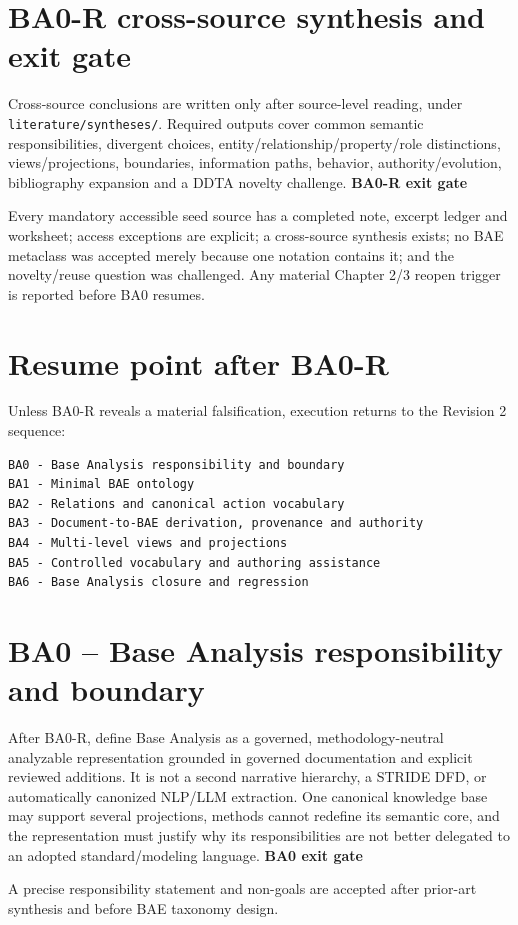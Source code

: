 \documentclass[11pt,a4paper]{article}
\newenvironment{gate}[1]{\def\FrameCommand{\fcolorbox{ddtagreen}{ddtagray}}\MakeFramed{\advance\hsize-2\width\FrameRestore}\noindent\textbf{#1}\par\smallskip}{\endMakeFramed}
\begin{document}
\section{BA0-R cross-source synthesis and exit gate}
Cross-source conclusions are written only after source-level reading, under \texttt{literature/syntheses/}. Required outputs cover common semantic responsibilities, divergent choices, entity/relationship/property/role distinctions, views/projections, boundaries, information paths, behavior, authority/evolution, bibliography expansion and a DDTA novelty challenge.
\begin{gate}{BA0-R exit gate}
Every mandatory accessible seed source has a completed note, excerpt ledger and worksheet; access exceptions are explicit; a cross-source synthesis exists; no BAE metaclass was accepted merely because one notation contains it; and the novelty/reuse question was challenged. Any material Chapter 2/3 reopen trigger is reported before BA0 resumes.
\end{gate}

\section{Resume point after BA0-R}
Unless BA0-R reveals a material falsification, execution returns to the Revision 2 sequence:
\begin{lstlisting}
BA0 - Base Analysis responsibility and boundary
BA1 - Minimal BAE ontology
BA2 - Relations and canonical action vocabulary
BA3 - Document-to-BAE derivation, provenance and authority
BA4 - Multi-level views and projections
BA5 - Controlled vocabulary and authoring assistance
BA6 - Base Analysis closure and regression
\end{lstlisting}

\section{BA0 -- Base Analysis responsibility and boundary}
After BA0-R, define Base Analysis as a governed, methodology-neutral analyzable representation grounded in governed documentation and explicit reviewed additions. It is not a second narrative hierarchy, a STRIDE DFD, or automatically canonized NLP/LLM extraction. One canonical knowledge base may support several projections, methods cannot redefine its semantic core, and the representation must justify why its responsibilities are not better delegated to an adopted standard/modeling language.
\begin{gate}{BA0 exit gate}A precise responsibility statement and non-goals are accepted after prior-art synthesis and before BAE taxonomy design.\end{gate}
\end{document}
